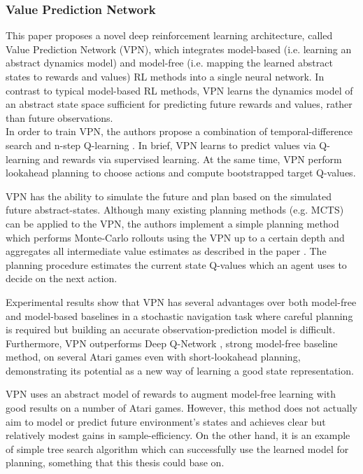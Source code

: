 \subsubsection{Value Prediction Network}

This paper \cite{Algo.VPN} proposes a novel deep reinforcement learning architecture, called Value Prediction Network (VPN), which integrates model-based (i.e. learning an abstract dynamics model) and model-free (i.e. mapping the learned abstract states to rewards and values) RL methods into a single neural network. In contrast to typical model-based RL methods, VPN learns the dynamics model of an abstract state space sufficient for predicting future rewards and values, rather than future observations. \\
In order to train VPN, the authors propose a combination of temporal-difference search \cite{Algo.TDSearch} and n-step Q-learning \cite{Algo.A3C}. In brief, VPN learns to predict values via Q-learning and rewards via supervised learning. At the same time, VPN perform lookahead planning to choose actions and compute bootstrapped target Q-values.

VPN has the ability to simulate the future and plan based on the simulated future abstract-states. Although many existing planning methods (e.g. MCTS) can be applied to the VPN, the authors implement a simple planning method which performs Monte-Carlo rollouts using the VPN up to a certain depth and aggregates all intermediate value estimates as described in the paper \cite{Algo.VPN}. The planning procedure estimates the current state Q-values which an agent uses to decide on the next action.

Experimental results show that VPN has several advantages over both model-free and model-based baselines in a stochastic navigation task where careful planning is required but building an accurate observation-prediction model is difficult. Furthermore, VPN outperforms Deep Q-Network \cite{Algo.DQN}, strong model-free baseline method, on several Atari games even with short-lookahead planning, demonstrating its potential as a new way of learning a good state representation.

VPN uses an abstract model of rewards to augment model-free learning with good results on a number of Atari games. However, this method does not actually aim to model or predict future environment's states and achieves clear but relatively modest gains in sample-efficiency. On the other hand, it is an example of simple tree search algorithm which can successfully use the learned model for planning, something that this thesis could base on.
